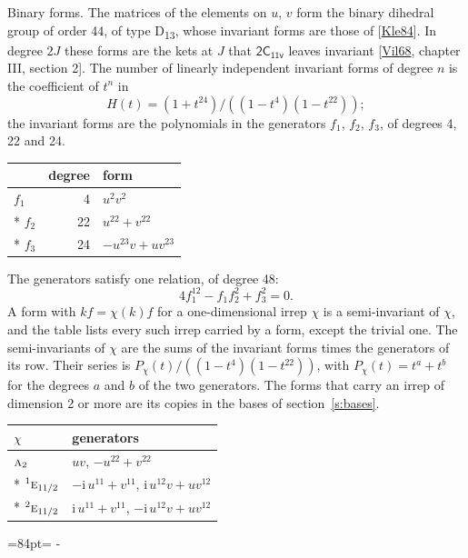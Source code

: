 \documentclass[10pt,a4paper]{article}
\makeatletter
\renewcommand\paragraph{\@startsection{paragraph}{4}{\z@}{1.5ex plus .5ex minus .2ex}{-1em}%
  {\normalfont\small\sffamily\bfseries\color{parttitle}}}
\newcommand{\needspace}[1]{\par\penalty-100\begingroup\dimen0=#1\relax\dimen2=\pagegoal
  \advance\dimen2-\pagetotal\ifdim\dimen0>\dimen2\relax\ifdim\dimen2>0pt\vfil\break\fi\fi
  \endgroup}
\numberwithin{equation}{section}
\newcommand{\grp}[1]{\mathsf{#1}}
\newcommand{\irr}[1]{\text{\normalfont\scshape #1}}
\newcommand{\conjpair}[1]{{}^{#1}}
\newcommand{\iunit}{\mathrm{i}}
\makeatother
\begin{document}
\paragraph{Binary forms.}
The matrices of the elements on $u$, $v$ form the binary dihedral group of order 44, of type D\textsubscript{13}, whose invariant forms are those of [\href{../../../REFERENCES.pdf\#ref.Kle84}{Kle84}]. In degree $2J$ these forms are the kets at $J$ that $\grp{2C_{11v}}$ leaves invariant [\href{../../../REFERENCES.pdf\#ref.Vil68}{Vil68}, chapter III, section 2]. \label{n:head.degree}\label{n:head.form}The number of linearly independent invariant forms of degree $n$ is the coefficient of $t^n$ in
\begin{equation}\label{e:molien}H(t) = (1 + t^{24})/((1-t^{4})(1-t^{22}));\end{equation}
the invariant forms are the polynomials in the generators $f_1$, $f_2$, $f_3$, of degrees 4, 22 and 24.
{\small\begin{longtable}{@{}lrl@{}}\toprule
& degree & form\\\midrule\endhead
\bottomrule\endfoot\endlastfoot
$f_{1}$ & 4 & $u^{2}v^{2}$\\*
$f_{2}$ & 22 & $u^{22} + v^{22}$\\*
$f_{3}$ & 24 & $-u^{23}v + uv^{23}$\\
\bottomrule\end{longtable}}
The generators satisfy one relation, of degree 48:
\begin{equation}\label{e:relation}4f_{1}^{12} - f_{1}f_{2}^{2} + f_{3}^{2} = 0.\end{equation}
A form with $k f = \chi(k) f$ for a one-dimensional irrep $\chi$ is a semi-invariant of $\chi$, and the table lists every such irrep carried by a form, except the trivial one. \label{n:head.generators}The semi-invariants of $\chi$ are the sums of the invariant forms times the generators of its row. Their series is $P_\chi(t)/((1-t^{4})(1-t^{22}))$, with $P_\chi(t) = t^{a} + t^{b}$ for the degrees $a$ and $b$ of the two generators. The forms that carry an irrep of dimension 2 or more are its copies in the bases of section~\ref{s:bases}.
{\small\begin{longtable}{@{}ll@{}}\toprule
$\chi$ & generators\\\midrule\endhead
\bottomrule\endfoot\endlastfoot
$\irr{a}_{2}$ & $uv$, $-u^{22} + v^{22}$\\*
$\conjpair{1}\irr{e}_{11/2}$ & $-\iunit{}\,u^{11} + v^{11}$, $\iunit{}\,u^{12}v + uv^{12}$\\*
$\conjpair{2}\irr{e}_{11/2}$ & $\iunit{}\,u^{11} + v^{11}$, $-\iunit{}\,u^{12}v + uv^{12}$\\
\bottomrule\end{longtable}}
\needspace{84pt}
\end{document}
